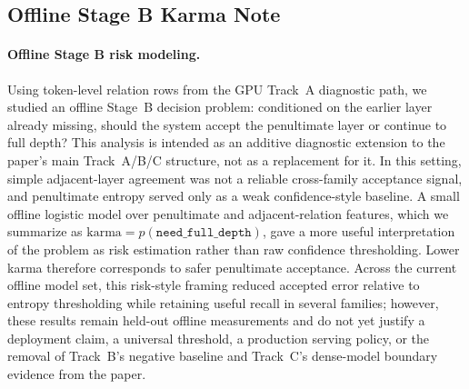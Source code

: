 \documentclass[11pt]{article}
\begin{document}
\subsection{Offline Stage B Karma Note}
\paragraph{Offline Stage B risk modeling.}
Using token-level relation rows from the GPU Track~A diagnostic path, we studied an offline Stage~B decision problem: conditioned on the earlier layer already missing, should the system accept the penultimate layer or continue to full depth? This analysis is intended as an additive diagnostic extension to the paper's main Track~A/B/C structure, not as a replacement for it. In this setting, simple adjacent-layer agreement was not a reliable cross-family acceptance signal, and penultimate entropy served only as a weak confidence-style baseline. A small offline logistic model over penultimate and adjacent-relation features, which we summarize as $\mathrm{karma} = p(\texttt{need\_full\_depth})$, gave a more useful interpretation of the problem as risk estimation rather than raw confidence thresholding. Lower karma therefore corresponds to safer penultimate acceptance. Across the current offline model set, this risk-style framing reduced accepted error relative to entropy thresholding while retaining useful recall in several families; however, these results remain held-out offline measurements and do not yet justify a deployment claim, a universal threshold, a production serving policy, or the removal of Track~B's negative baseline and Track~C's dense-model boundary evidence from the paper.



\end{document}
